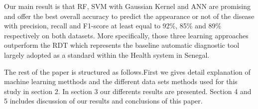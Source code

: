  Our main result is that RF, SVM  with Gaussian Kernel and ANN are promising and offer the best overall accuracy to predict the appearance or not of the disease with precision, recall and F1-score at least equal to 92\%, 85\% and 89\% respectively on both datasets. More specifically, those three learning approaches outperform the RDT which represents the baseline automatic diagnostic tool largely adopted as a standard within the Health system in Senegal.
 
The rest of the paper is structured as follows.First we gives detail explanation of machine learning metthods and the different data sets methods used for this study in section 2. In section 3 our  differents results are presented. Section 4 and 5 includes discussion of our results and conclusions of this paper.
 
 